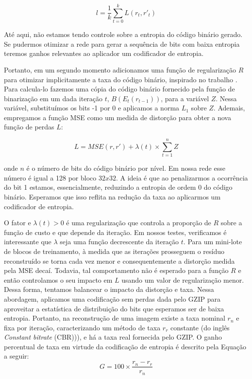 \begin{equation}
l = \frac{1}{k} \sum_{t=0}^k L(r_t,r'_t) 
\end{equation}


Até aqui, não estamos tendo controle sobre a entropia do código binário gerado. Se pudermos otimizar a rede para gerar a sequência de bits com baixa entropia teremos ganhos relevantes ao aplicador um codificador de entropia.

Portanto, em um segundo momento adicionamos uma função de regularização $R$ para otimizar implicitamente a taxa do código binário, inspirado no trabalho \cite{zhao1901cae}. 
Para calcula-lo fazemos uma cópia do código binário fornecido pela função de binarização em um dada iteração $t$, $B(E_t(r_{t-1}))$, para a variável $Z$. Nessa variável, substituímos os bits -1 por 0 e aplicamos a norma $L_1$ sobre $Z$. Ademais, empregamos a função MSE como um medida de distorção para obter a nova função de perdas $L$:   

\begin{equation}
\label{eq:rdo}
L = MSE(r,r') + \lambda(t) \times \sum_{t=1}^{n} Z 
\end{equation}


onde $n$ é o número de bits do código binário por nível. Em nossa rede esse número é igual a 128 por bloco $32x32$. A ideia é que ao penalizarmos a ocorrência do bit 1 estamos, essencialmente, reduzindo a entropia de ordem 0 do código binário. Esperamos que isso reflita na redução da taxa ao aplicarmos um codificador de entropia.   

O fator e $\lambda(t) >0$ é uma regularização que controla a proporção de $R$ sobre a função de custo e que depende da iteração. Em nossos testes, verificamos é interessante que $\lambda$ seja uma função decrescente da iteração $t$. Para um mini-lote de blocos de treinamento, à medida que as iterações prosseguem o resíduo reconstruído se torna cada vez menor e consequentemente a distorção medida pela MSE decaí. Todavia, tal comportamento não é esperado para a função $R$ e então controlamos o seu impacto em $L$ usando um valor de regularização menor. Dessa forma, tentamos balancear o impacto da distorção e taxa.  
Nessa abordagem, aplicamos uma codificação sem perdas dada pelo GZIP para aproveitar a estatística de distribuição do bits que esperamos ser de baixa entropia. Portanto, na reconstrução de uma imagem existe a taxa nominal $r_n$ e fixa por iteração, caracterizando um método de taxa $r_r$ constante (do inglês \textit{Constant bitrate} (CBR))), e há a taxa real fornecida pelo GZIP. O ganho percentual de taxa em virtude da codificação de entropia é descrito pela Equação a seguir:
\begin{equation}
\label{eq:gain_ce}
G = 100 \times \frac{r_n-r_r}{r_n}
\end{equation}




